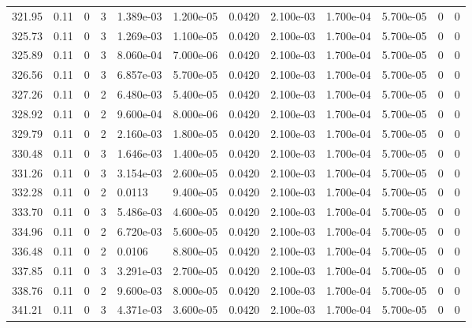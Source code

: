 \documentclass[preview]{standalone}
\begin{document}
{{{{{{{{\begin{tabular}{L{1.2cm}C{1.2cm} C{0.3cm}C{0.5cm} C{1.4cm}C{1.4cm} C{1.4cm}C{1.4cm} C{1.6cm}C{1.6cm} C{1.6cm}C{1.6cm}}
  321.95  &  0.11  & 0     &  3 &  1.389e-03  & 1.200e-05  &  0.0420&   2.100e-03& 1.700e-04 & 5.700e-05   &  0 & 0  \\ 
  325.73  &  0.11  & 0     &  3 &  1.269e-03  & 1.100e-05  &  0.0420&   2.100e-03& 1.700e-04 & 5.700e-05   &  0 & 0  \\ 
  325.89  &  0.11  & 0     &  3 &  8.060e-04  & 7.000e-06  &  0.0420&   2.100e-03& 1.700e-04 & 5.700e-05   &  0 & 0  \\ 
  326.56  &  0.11  & 0     &  3 &  6.857e-03  & 5.700e-05  &  0.0420&   2.100e-03& 1.700e-04 & 5.700e-05   &  0 & 0  \\ 
  327.26  &  0.11  & 0     &  2 &  6.480e-03  & 5.400e-05  &  0.0420&   2.100e-03& 1.700e-04 & 5.700e-05   &  0 & 0  \\ 
  328.92  &  0.11  & 0     &  2 &  9.600e-04  & 8.000e-06  &  0.0420&   2.100e-03& 1.700e-04 & 5.700e-05   &  0 & 0  \\ 
  329.79  &  0.11  & 0     &  2 &  2.160e-03  & 1.800e-05  &  0.0420&   2.100e-03& 1.700e-04 & 5.700e-05   &  0 & 0  \\ 
  330.48  &  0.11  & 0     &  3 &  1.646e-03  & 1.400e-05  &  0.0420&   2.100e-03& 1.700e-04 & 5.700e-05   &  0 & 0  \\ 
  331.26  &  0.11  & 0     &  3 &  3.154e-03  & 2.600e-05  &  0.0420&   2.100e-03& 1.700e-04 & 5.700e-05   &  0 & 0  \\ 
  332.28  &  0.11  & 0     &  2 &  0.0113  & 9.400e-05  &  0.0420&   2.100e-03& 1.700e-04 & 5.700e-05   &  0 & 0  \\ 
  333.70  &  0.11  & 0     &  3 &  5.486e-03  & 4.600e-05  &  0.0420&   2.100e-03& 1.700e-04 & 5.700e-05   &  0 & 0  \\ 
  334.96  &  0.11  & 0     &  2 &  6.720e-03  & 5.600e-05  &  0.0420&   2.100e-03& 1.700e-04 & 5.700e-05   &  0 & 0  \\ 
  336.48  &  0.11  & 0     &  2 &  0.0106  & 8.800e-05  &  0.0420&   2.100e-03& 1.700e-04 & 5.700e-05   &  0 & 0  \\ 
  337.85  &  0.11  & 0     &  3 &  3.291e-03  & 2.700e-05  &  0.0420&   2.100e-03& 1.700e-04 & 5.700e-05   &  0 & 0  \\ 
  338.76  &  0.11  & 0     &  2 &  9.600e-03  & 8.000e-05  &  0.0420&   2.100e-03& 1.700e-04 & 5.700e-05   &  0 & 0  \\ 
  341.21  &  0.11  & 0     &  3 &  4.371e-03  & 3.600e-05  &  0.0420&   2.100e-03& 1.700e-04 & 5.700e-05   &  0 & 0  \\ 
\hline 
\end{tabular} 

}}}}}}}}
\end{document}
